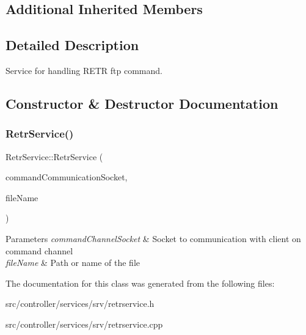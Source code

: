 \subsection*{Additional Inherited Members}


\subsection{Detailed Description}
Service for handling R\+E\+TR ftp command. 

\subsection{Constructor \& Destructor Documentation}
\mbox{\label{classRetrService_a9540dcf841b69e54405b8600aa75ca74}} 
\subsubsection{\texorpdfstring{Retr\+Service()}{RetrService()}}
{\footnotesize\ttfamily Retr\+Service\+::\+Retr\+Service (\begin{DoxyParamCaption}\item[{int}]{command\+Communication\+Socket,  }\item[{const Q\+String \&}]{file\+Name }\end{DoxyParamCaption})}


\begin{DoxyParams}{Parameters}
{\em command\+Channel\+Socket} & Socket to communication with client on command channel \\
\hline
{\em file\+Name} & Path or name of the file \\
\hline
\end{DoxyParams}


The documentation for this class was generated from the following files\+:\begin{DoxyCompactItemize}
\item 
src/controller/services/srv/retrservice.\+h\item 
src/controller/services/srv/retrservice.\+cpp\end{DoxyCompactItemize}
